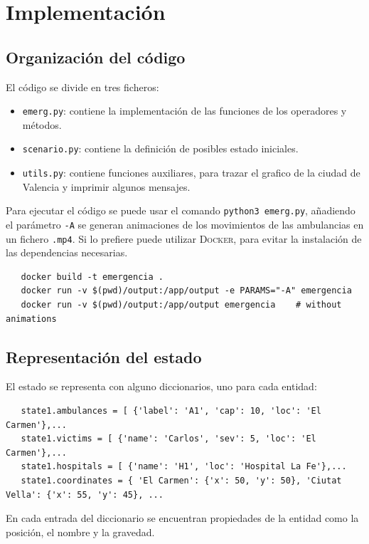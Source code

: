 \section{Implementación}

\subsection{Organización del código}
El código se divide en tres ficheros:
\begin{itemize}
   \item \texttt{emerg.py}: contiene la implementación de las funciones de los operadores y métodos.
   \item \texttt{scenario.py}: contiene la definición de posibles estado iniciales.
   \item \texttt{utils.py}: contiene funciones auxiliares, para trazar el grafico de la ciudad de Valencia y imprimir algunos mensajes.
\end{itemize}

Para ejecutar el código se puede usar el comando \texttt{python3 emerg.py}, añadiendo el parámetro \texttt{-A} se generan animaciones de los movimientos de las ambulancias en un fichero \texttt{.mp4}.
Si lo prefiere puede utilizar \textsc{Docker}, para evitar la instalación de las dependencias necesarias.

\begin{verbatim}
   docker build -t emergencia .
   docker run -v $(pwd)/output:/app/output -e PARAMS="-A" emergencia
   docker run -v $(pwd)/output:/app/output emergencia    # without animations
\end{verbatim}



\subsection{Representación del estado}
El estado se representa con alguno diccionarios, uno para cada entidad:
\begin{lstlisting}
   state1.ambulances = [ {'label': 'A1', 'cap': 10, 'loc': 'El Carmen'},...
   state1.victims = [ {'name': 'Carlos', 'sev': 5, 'loc': 'El Carmen'},...
   state1.hospitals = [ {'name': 'H1', 'loc': 'Hospital La Fe'},...
   state1.coordinates = { 'El Carmen': {'x': 50, 'y': 50}, 'Ciutat Vella': {'x': 55, 'y': 45}, ...
\end{lstlisting}
En cada entrada del diccionario se encuentran propiedades de la entidad como la posición, el nombre y la gravedad.


